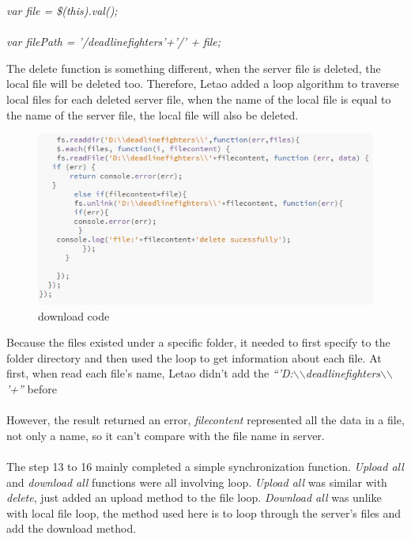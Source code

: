 \documentclass[a4paper]{article}
\begin{document}
{\begin{center}
\emph{var file = \$(this).val();}\\\\
\emph{var filePath = '/deadlinefighters'+'/' + file;}
\end{center}

The delete function is something different, when the server file is deleted, the local file will be deleted too. Therefore, Letao added a loop algorithm to traverse local files for each deleted server file, when the name of the local file is equal to the name of the server file, the local file will also be deleted.

\begin{figure}[h!]
\centering
\includegraphics[scale=1.2]{code3}
\caption{download code}
\label{fig:code3}
\end{figure}

Because the files existed under a specific folder, it needed to first specify to the folder directory and then used the loop to get information about each file. At first, when read each file’s name, Letao didn’t add the \emph{“'D:$\backslash$$\backslash$deadlinefighters$\backslash$$\backslash$'+”} before\\\\

However, the result returned an error, \emph{filecontent} represented all the data in a file, not only a name, so it can’t compare with the file name in server.\\\\

The step 13 to 16 mainly completed a simple synchronization function. \emph{Upload all} and \emph{download all} functions were all involving loop. \emph{Upload all} was similar with \emph{delete}, just added an upload method to the file loop. \emph{Download all} was unlike with local file loop, the method used here is to loop through the server's files and add the download method.\\\\

}
\end{document}
